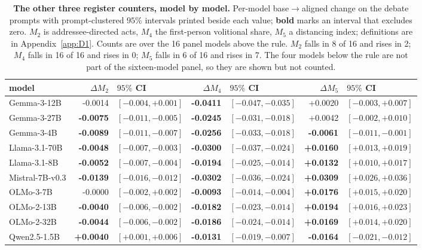 \begin{table}[tb]\centering\scriptsize\setlength{\tabcolsep}{3.2pt}
\caption{\textbf{The other three register counters, model by model.} Per-model base$\rightarrow$aligned change on the debate prompts with prompt-clustered $95\%$ intervals printed beside each value; \textbf{bold} marks an interval that excludes zero. $M_2$ is addressee-directed acts, $M_4$ the first-person volitional share, $M_5$ a distancing index; definitions are in Appendix~\ref{app:D1}. Counts are over the 16 panel models above the rule. $M_2$ falls in 8 of 16 and rises in 2; $M_4$ falls in 16 of 16 and rises in 0; $M_5$ falls in 6 of 16 and rises in 7. The four models below the rule are not part of the sixteen-model panel, so they are shown but not counted.}
\label{tab:otherM}
\begin{tabular}{lrlrlrl}
\toprule
model & $\Delta M_2$ & $95\%$ CI & $\Delta M_4$ & $95\%$ CI & $\Delta M_5$ & $95\%$ CI \\
\midrule
Gemma-3-12B & -0.0014 & $[-0.004,+0.001]$ & \textbf{-0.0411} & $[-0.047,-0.035]$ & +0.0020 & $[-0.003,+0.007]$ \\
Gemma-3-27B & \textbf{-0.0075} & $[-0.011,-0.005]$ & \textbf{-0.0245} & $[-0.031,-0.018]$ & +0.0042 & $[-0.002,+0.010]$ \\
Gemma-3-4B & \textbf{-0.0089} & $[-0.011,-0.007]$ & \textbf{-0.0256} & $[-0.033,-0.018]$ & \textbf{-0.0061} & $[-0.011,-0.001]$ \\
Llama-3.1-70B & \textbf{-0.0048} & $[-0.007,-0.003]$ & \textbf{-0.0300} & $[-0.037,-0.024]$ & \textbf{+0.0160} & $[+0.013,+0.019]$ \\
Llama-3.1-8B & \textbf{-0.0052} & $[-0.007,-0.004]$ & \textbf{-0.0194} & $[-0.025,-0.014]$ & \textbf{+0.0132} & $[+0.010,+0.017]$ \\
Mistral-7B-v0.3 & \textbf{-0.0139} & $[-0.016,-0.012]$ & \textbf{-0.0302} & $[-0.036,-0.024]$ & \textbf{+0.0309} & $[+0.026,+0.036]$ \\
OLMo-3-7B & -0.0000 & $[-0.002,+0.002]$ & \textbf{-0.0093} & $[-0.014,-0.004]$ & \textbf{+0.0176} & $[+0.015,+0.020]$ \\
OLMo-2-13B & \textbf{-0.0040} & $[-0.006,-0.002]$ & \textbf{-0.0182} & $[-0.023,-0.014]$ & \textbf{+0.0194} & $[+0.016,+0.023]$ \\
OLMo-2-32B & \textbf{-0.0044} & $[-0.006,-0.002]$ & \textbf{-0.0186} & $[-0.024,-0.014]$ & \textbf{+0.0169} & $[+0.014,+0.020]$ \\
Qwen2.5-1.5B & \textbf{+0.0040} & $[+0.001,+0.006]$ & \textbf{-0.0131} & $[-0.019,-0.007]$ & \textbf{-0.0164} & $[-0.021,-0.012]$ \\

\end{tabular}
\end{table}
